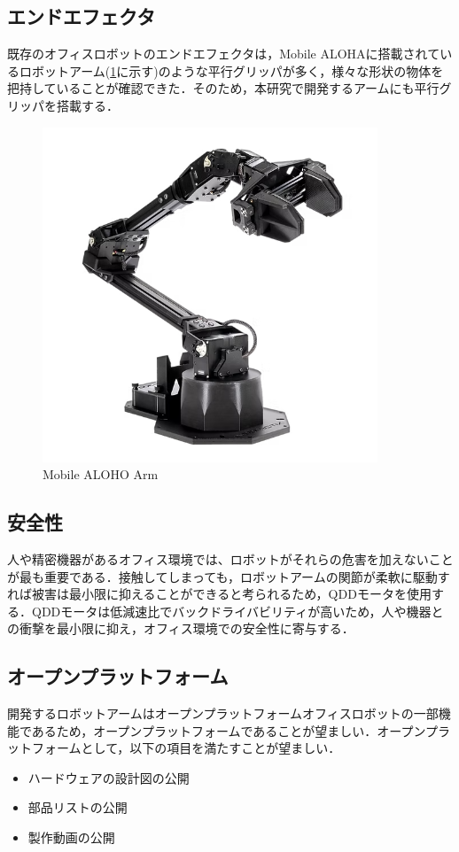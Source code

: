 \subsection{エンドエフェクタ}
既存のオフィスロボットのエンドエフェクタは，Mobile ALOHAに搭載されているロボットアーム(\ref{fig:alohaarm}に示す)のような平行グリッパが多く，様々な形状の物体を把持していることが確認できた．そのため，本研究で開発するアームにも平行グリッパを搭載する．

\begin{figure}[h]
  \centering
  \includegraphics[width=10cm]{images/alohaarm.png}
  \caption{Mobile ALOHO Arm}
  \label{fig:alohaarm}
\end{figure}

\subsection{安全性}
人や精密機器があるオフィス環境では、ロボットがそれらの危害を加えないことが最も重要である．接触してしまっても，ロボットアームの関節が柔軟に駆動すれば被害は最小限に抑えることができると考られるため，QDDモータを使用する．QDDモータは低減速比でバックドライバビリティが高いため，人や機器との衝撃を最小限に抑え，オフィス環境での安全性に寄与する．
\subsection{オープンプラットフォーム}
開発するロボットアームはオープンプラットフォームオフィスロボットの一部機能であるため，オープンプラットフォームであることが望ましい．オープンプラットフォームとして，以下の項目を満たすことが望ましい．
\begin{itemize}
  \item ハードウェアの設計図の公開
  \item 部品リストの公開
  \item 製作動画の公開
\end{itemize}

